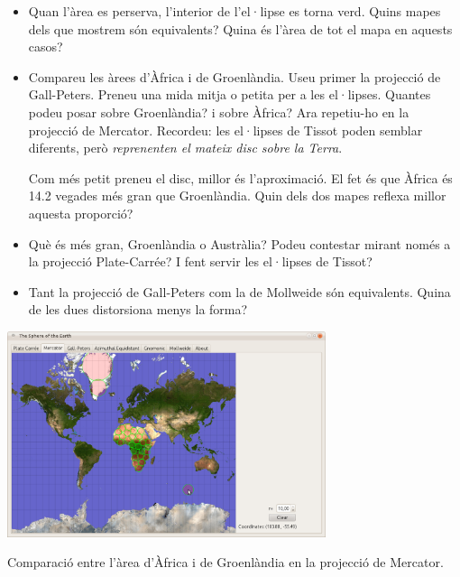 \documentclass[a4paper,12pt]{article}
\begin{document}
\begin{itemize}
 \item Quan l'àrea es perserva, l'interior de l'el·lipse es torna verd. Quins mapes dels que mostrem són equivalents? Quina és l'àrea de tot el mapa en aquests casos?
 
 \item Compareu les àrees d'Àfrica i de Groenlàndia. Useu primer la projecció de Gall-Peters. Preneu una mida mitja o petita per a les el·lipses. Quantes podeu posar sobre Groenlàndia? i sobre Àfrica? Ara repetiu-ho en la projecció de Mercator. Recordeu: les el·lipses de Tissot poden semblar diferents, però \emph{reprenenten el mateix disc sobre la Terra}.
 
 Com més petit preneu el disc, millor és l'aproximació. El fet és que Àfrica és 14.2 vegades més gran que Groenlàndia. Quin dels dos mapes reflexa millor aquesta proporció?
 

 \item Què és més gran, Groenlàndia o Austràlia? Podeu contestar mirant només a la projecció Plate-Carrée? I fent servir les el·lipses de Tissot?

 \item Tant la projecció de Gall-Peters com la de Mollweide són equivalents. Quina de les dues distorsiona menys la forma?


\end{itemize}



 \begin{center}
  \includegraphics[width=0.7\textwidth]{../common/merc1.png} 
  
{Comparació entre l'àrea d'Àfrica i de Groenlàndia en la projecció de Mercator.}
 \end{center}
\end{document}
